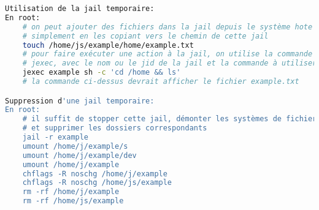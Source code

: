 \documentclass[10pt,a4paper]{article}
\begin{document}
\begin{lstlisting}[language=bash]
Utilisation de la jail temporaire:
En root:
    # on peut ajouter des fichiers dans la jail depuis le système hote
    # simplement en les copiant vers le chemin de cette jail
    touch /home/js/example/home/example.txt
    # pour faire exécuter une action à la jail, on utilise la commande
    # jexec, avec le nom ou le jid de la jail et la commande à utiliser
    jexec example sh -c 'cd /home && ls'
    # la commande ci-dessus devrait afficher le fichier example.txt

Suppression d'une jail temporaire:
En root:
    # il suffit de stopper cette jail, démonter les systèmes de fichiers
    # et supprimer les dossiers correspondants
    jail -r example
    umount /home/j/example/s
    umount /home/j/example/dev
    umount /home/j/example
    chflags -R noschg /home/j/example
    chflags -R noschg /home/js/example
    rm -rf /home/j/example
    rm -rf /home/js/example

\end{lstlisting}
\end{document}
